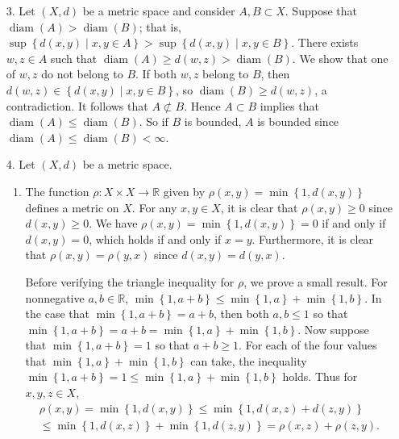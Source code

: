 \documentclass[11pt,leqno]{article}
\theoremstyle{plain}
\theoremstyle{definition}
\numberwithin{equation}{section}
\numberwithin{lem}{section}
\newcommand{\cbr}[1]{\left\{#1\right\}}
\DeclareMathOperator{\diam}{diam}
\begin{document}
\begin{enumerate}
  \item[3.] Let $(X,d)$ be a metric space and consider $A,B\subset X$. Suppose that $\diam(A)>\diam(B)$; that is, $\sup \cbr{d(x,y)\mid x,y\in A}> \sup \cbr{d(x,y)\mid x,y\in B}$. There exists $w,z\in A$ such that $\diam(A) \geq d(w,z)>\diam(B)$. We show that one of $w,z$ do not belong to $B$. If both $w,z$ belong to $B$, then $d(w,z)\in \cbr{d(x,y)\mid x,y\in B}$, so $\diam(B)\geq d(w,z)$, a contradiction. It follows that $A\not\subset B$. Hence $A\subset B$ implies that $\diam(A)\leq \diam(B)$. So if $B$ is bounded, $A$ is bounded since $\diam(A)\leq \diam(B)< \infty$.
  
  \item[4.] Let $(X,d)$ be a metric space.
  \begin{enumerate}
    \item The function $\rho\colon X\times X\to \mathbb R$ given by $\rho(x,y) = \min\cbr{1,d(x,y)}$ defines a metric on $X$. For any $x,y\in X$, it is clear that $\rho(x,y)\geq 0$ since $d(x,y)\geq 0$. We have $\rho(x,y) = \min\cbr{1,d(x,y)} = 0$ if and only if $d(x,y) = 0$, which holds if and only if $x = y$. Furthermore, it is clear that $\rho(x,y) = \rho(y,x)$ since $d(x,y) = d(y,x)$.
    
    Before verifying the triangle inequality for $\rho$, we prove a small result. For nonnegative $a,b\in\mathbb R$, $\min\cbr{1,a+b}\leq \min\cbr{1,a} + \min\cbr{1,b}$. In the case that $\min\cbr{1,a+b}= a+b$, then both $a,b\leq 1$ so that $\min\cbr{1,a+b} = a+b = \min\cbr{1,a} + \min\cbr{1,b}$. 
    Now suppose that $\min\cbr{1,a+b}= 1$ so that $a+b\geq 1$.
    For each of the four values that $\min\cbr{1,a} + \min\cbr{1,b}$ can take, the inequality $\min\cbr{1,a+b}= 1\leq \min\cbr{1,a} + \min\cbr{1,b}$ holds. Thus for $x,y,z\in X$, \begin{multline*}
      \rho(x,y) = \min\cbr{1,d(x,y)}\leq \min\cbr{1,d(x,z) + d(z,y)}\\\leq \min\cbr{1,d(x,z)} + \min\cbr{1,d(z,y)} = \rho(x,z) + \rho(z,y).
    \end{multline*}


\end{enumerate}
\end{enumerate}
\end{document}
